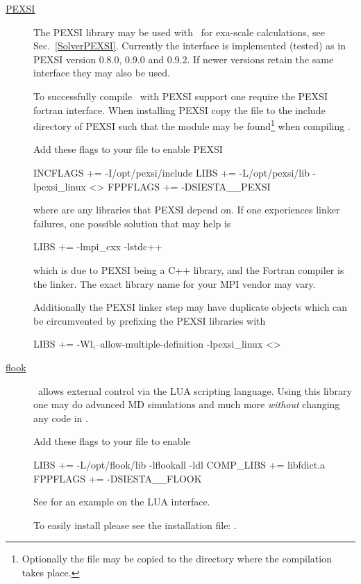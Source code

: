 \begin{description}
  \item[\href{https://math.berkeley.edu/~linlin/pexsi}{PEXSI}]%
  The PEXSI library may be used with \siesta\ for exa-scale
  calculations, see Sec.~\ref{SolverPEXSI}. Currently the interface is
  implemented (tested) as in PEXSI version 0.8.0, 0.9.0 and 0.9.2. If
  newer versions retain the same interface they may also be used.

  To successfully compile \siesta\ with PEXSI support one require the
  PEXSI fortran interface. When installing PEXSI copy the
   file to the include directory of
  PEXSI such that the module may be found\footnote{Optionally the file
      may be copied to the  directory where the compilation
      takes place.} when compiling \siesta.

  Add these flags to your  file to enable PEXSI
\begin{shellexample}
  INCFLAGS += -I/opt/pexsi/include
  LIBS += -L/opt/pexsi/lib -lpexsi_linux <>
  FPPFLAGS += -DSIESTA__PEXSI
\end{shellexample}
  where \shell{<>} are any libraries that PEXSI depend on. 
  If one experiences linker failures, one possible solution that may
  help is
\begin{shellexample}
  LIBS += -lmpi_cxx -lstdc++
\end{shellexample}
  which is due to PEXSI being a C++ library, and the Fortran compiler
  is the linker. The exact library name for your MPI vendor may
  vary. 

  Additionally the PEXSI linker step may have duplicate objects which
  can be circumvented by prefixing the PEXSI libraries with
\begin{shellexample}
  LIBS += -Wl,--allow-multiple-definition -lpexsi_linux <>
\end{shellexample}


  \item[\href{https://github.com/electronicstructurelibrary/flook}{flook}]%
  \siesta\ allows external control via the LUA scripting language.
  Using this library one may do advanced MD simulations and much more
  \emph{without} changing any code in \siesta.
  
  Add these flags to your  file to enable 
\begin{shellexample}
  LIBS += -L/opt/flook/lib -lflookall -ldl
  COMP_LIBS += libfdict.a
  FPPFLAGS += -DSIESTA__FLOOK
\end{shellexample}
  
  See  for an example on the LUA interface.

  To easily install  please see the installation file:
  .

\end{description}


